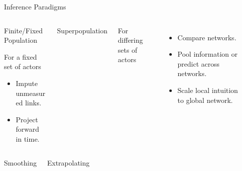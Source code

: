 \documentclass{beamer}
\begin{document}
 \begin{frame}{Inference Paradigms}
     \begin{columns}[T]
         \begin{column}{0.45\textwidth}
         \begin{center}\alert{Finite/Fixed Population}\end{center}
         For a fixed set of actors
         \begin{itemize}
             \item Impute unmeasured links.
             \item Project forward in time. 
         \end{itemize}
          \pause
      \end{column}
          \vrule
          \hspace{1.5em}
         \begin{center}\alert{Superpopulation}\end{center}
         For differing sets of actors
         \begin{itemize}
             \item Compare networks.
             \item Pool information or predict across networks.
             \item Scale local intuition to global network.
         \end{itemize}
         ~
     \end{columns}
     \pause
     \begin{columns}
         \begin{center}\alert{Smoothing}\end{center}
         \begin{center}\alert{Extrapolating}\end{center}
     \end{columns}
 \end{frame}
\end{document}
